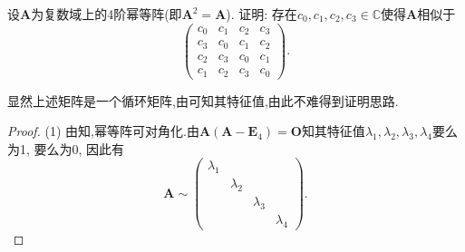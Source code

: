 \documentclass[../../main.tex]{subfiles}
\begin{document}
\begin{example}
设$\boldsymbol{A}$为复数域上的4阶幂等阵(即$\boldsymbol{A}^2 = \boldsymbol{A}$). 证明: 存在$c_0,c_1,c_2,c_3 \in \mathbb{C}$使得$\boldsymbol{A}$相似于
$$
\begin{pmatrix}
c_0 & c_1 & c_2 & c_3 \\
c_3 & c_0 & c_1 & c_2 \\
c_2 & c_3 & c_0 & c_1 \\
c_1 & c_2 & c_3 & c_0
\end{pmatrix}.
$$
\end{example}
\begin{note}
显然上述矩阵是一个循环矩阵,由可知其特征值,由此不难得到证明思路.
\end{note}
\begin{proof}
(1) 由知,幂等阵可对角化.由$\boldsymbol{A}(\boldsymbol{A}-\boldsymbol{E}_4)=\boldsymbol{O}$知其特征值$\lambda_1,\lambda_2,\lambda_3,\lambda_4$要么为1, 要么为0, 因此有
$$
\boldsymbol{A} \sim \begin{pmatrix}
\lambda_1 & & & \\
& \lambda_2 & & \\
& & \lambda_3 & \\
& & & \lambda_4
\end{pmatrix}.
$$


\end{proof}
\end{document}
